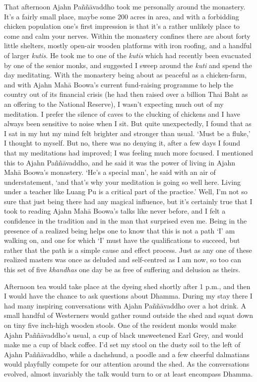 That afternoon Ajahn Paññāvaddho took me personally around the
monastery. It's a fairly small place, maybe some 200 acres in area, and
with a forbidding chicken population one's first impression is that it's
a rather unlikely place to come and calm your nerves. Within the
monastery confines there are about forty little shelters, mostly
open-air wooden platforms with iron roofing, and a handful of larger
\emph{kutis}. He took me to one of the \emph{kutis} which had recently
been evacuated by one of the senior monks, and suggested I sweep around
the \emph{kuti} and spend the day meditating. With the monastery being
about as peaceful as a chicken-farm, and with Ajahn Mahā Boowa's current
fund-raising programme to help the country out of its financial crisis
(he had then raised over a billion Thai Baht as an offering to the
National Reserve), I wasn't expecting much out of my meditation. I
prefer the silence of caves to the clucking of chickens and I have
always been sensitive to noise when I sit. But quite unexpectedly, I
found that as I sat in my hut my mind felt brighter and stronger than
usual. `Must be a fluke,' I thought to myself. But no, there was no
denying it, after a few days I found that my meditations had improved; I
was feeling much more focused. I mentioned this to Ajahn Paññāvaddho,
and he said it was the power of living in Ajahn Mahā Boowa's monastery.
`He's a special man', he said with an air of understatement, `and that's
why your meditation is going so well here. Living under a teacher like
Luang Pu is a critical part of the practice.' Well, I'm not so sure that
just being there had any magical influence, but it's certainly true that
I took to reading Ajahn Mahā Boowa's talks like never before, and I felt
a confidence in the tradition and in the man that surprised even me.
Being in the presence of a realized being helps one to know that this is
not a path `I' am walking on, and one for which `I' must have the
qualifications to succeed, but rather that the path is a simple cause
and effect process. Just as any one of these realized masters was once
as deluded and self-centred as I am now, so too can this set of five
\emph{khandhas} one day be as free of suffering and delusion as theirs.

Afternoon tea would take place at the dyeing shed shortly after 1 p.m.,
and then I would have the chance to ask questions about Dhamma. During
my stay there I had many inspiring conversations with Ajahn Paññāvaddho
over a hot drink. A small handful of Westerners would gather round
outside the shed and squat down on tiny five inch-high wooden stools.
One of the resident monks would make Ajahn Paññāvaddho's usual, a cup of
black unsweetened Earl Grey, and would make me a cup of black coffee.
I'd set my stool on the dusty soil to the left of Ajahn Paññāvaddho,
while a dachshund, a poodle and a few cheerful dalmatians would
playfully compete for our attention around the shed. As the
conversations evolved, almost invariably the talk would turn to or at
least encompass Dhamma.

